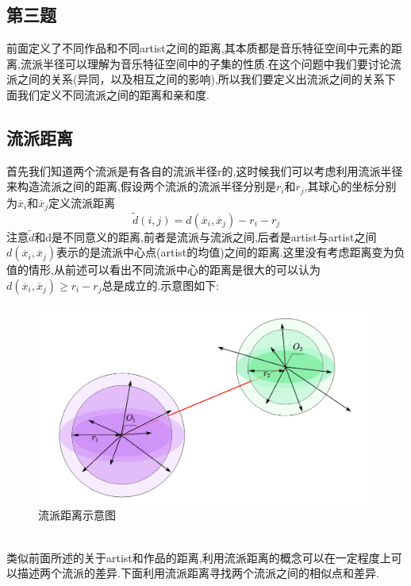 \documentclass[a4paper,12pt]{article}
\begin{document}
\begin{spacing}{1.2}
\section{第三题}
前面定义了不同作品和不同artist之间的距离,其本质都是音乐特征空间中元素的距离,流派半径可以理解为音乐特征空间中的子集的性质.在这个问题中我们要讨论流派之间的关系(异同，以及相互之间的影响),所以我们要定义出流派之间的关系下面我们定义不同流派之间的距离和亲和度.
\subsection{流派距离}
首先我们知道两个流派是有各自的流派半径r的,这时候我们可以考虑利用流派半径来构造流派之间的距离,假设两个流派的流派半径分别是$r_{i}$和$r_{j}$,其球心的坐标分别为$\overline{x}_{i}$和$\overline{x}_{j}$定义流派距离
$$
\widetilde{d}(i,j)=d(\overline{x}_{i},\overline{x}_{j})-r_{i}-r_{j}
$$
注意$\widetilde{d}$和d是不同意义的距离,前者是流派与流派之间,后者是artist与artist之间$d(\overline{x}_{i},\overline{x}_{j})$表示的是流派中心点(artist的均值)之间的距离.这里没有考虑距离变为负值的情形,从前述可以看出不同流派中心的距离是很大的可以认为$d(\overline{x}_{i},\overline{x}_{j})\geqslant r_{i}-r_{j}$总是成立的.示意图如下:
	\begin{figure}[!h]
	\begin{center}
		\includegraphics[scale=0.25]{dis2.png}
		\caption{流派距离示意图}
	\end{center}
\end{figure}\\
类似前面所述的关于artist和作品的距离,利用流派距离的概念可以在一定程度上可以描述两个流派的差异.下面利用流派距离寻找两个流派之间的相似点和差异.

\end{spacing}
\end{document}

